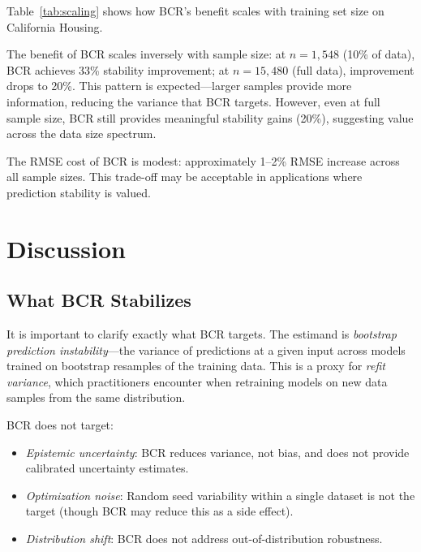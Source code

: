\documentclass[12pt, letterpaper]{article}
\begin{document}
Table~\ref{tab:scaling} shows how BCR's benefit scales with training set size on California Housing.

\begin{table}[t]
\centering
\caption{Sample size scaling on California Housing. BCR's stability benefit decreases as sample size increases.}
\label{tab:scaling}
\small

\end{table}

The benefit of BCR scales inversely with sample size: at $n=1{,}548$ (10\% of data), BCR achieves 33\% stability improvement; at $n=15{,}480$ (full data), improvement drops to 20\%. This pattern is expected---larger samples provide more information, reducing the variance that BCR targets. However, even at full sample size, BCR still provides meaningful stability gains (20\%), suggesting value across the data size spectrum.

The RMSE cost of BCR is modest: approximately 1--2\% RMSE increase across all sample sizes. This trade-off may be acceptable in applications where prediction stability is valued.

\section{Discussion}

\subsection{What BCR Stabilizes}

It is important to clarify exactly what BCR targets. The estimand is \emph{bootstrap prediction instability}---the variance of predictions at a given input across models trained on bootstrap resamples of the training data. This is a proxy for \emph{refit variance}, which practitioners encounter when retraining models on new data samples from the same distribution.

BCR does not target:
\begin{itemize}
\item \emph{Epistemic uncertainty}: BCR reduces variance, not bias, and does not provide calibrated uncertainty estimates.
\item \emph{Optimization noise}: Random seed variability within a single dataset is not the target (though BCR may reduce this as a side effect).
\item \emph{Distribution shift}: BCR does not address out-of-distribution robustness.
\end{itemize}
\end{document}
